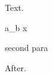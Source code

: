\documentclass{article}
\begin{document}
Text.
\begin{spverbatim}
a_b {x} \foo

second para
\end{spverbatim}
After.
\end{document}
